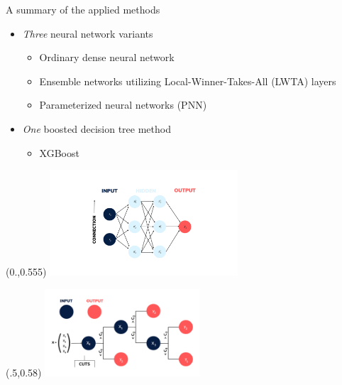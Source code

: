 \documentclass[UKenglish]{beamer}
\begin{document}
\begin{frame}{A summary of the applied methods}
    \begin{itemize}

    \item \emph{Three} neural network variants
    \begin{itemize}
        \item Ordinary dense neural network
        \item Ensemble networks utilizing Local-Winner-Takes-All (LWTA) layers
        \item Parameterized neural networks (PNN)
    \end{itemize}

    \item \emph{One} boosted decision tree method
    \begin{itemize}
        \item XGBoost
    \end{itemize}

    \end{itemize}

    \begin{textblock}{1}(0.,0.555)
        \includegraphics[width=0.525\textwidth]{figures/Input_labels.png}
    \end{textblock}
    \begin{textblock}{1}(.5,0.58)
        \includegraphics[width=0.435\textwidth]{figures/DT.png}
    \end{textblock}
\end{frame}
\end{document}
